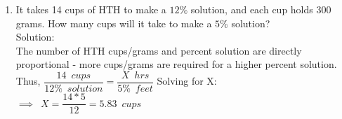 \begin{enumerate}
\item It takes 14 cups of $\mathrm{HTH}$ to make a $12 \%$ solution, and each cup holds 300 grams. How many cups will it take to make a $5 \%$ solution?\\
Solution:\\
\vspace{0.2cm}
The number of HTH cups/grams and percent solution are directly proportional - more cups/grams are required for a higher percent solution.\\
\vspace{0.2cm}
Thus, $\dfrac{14 \enspace cups}{12\% \enspace solution }=\dfrac{X \enspace hrs}{5\% \enspace feet}$
\vspace{0.2cm}
Solving for X:\\
\vspace{0.2cm}
$\implies \enspace X=\dfrac{14*5}{12}=\boxed{5.83 \enspace cups}$
\vspace{0.2cm}


\end{enumerate}
